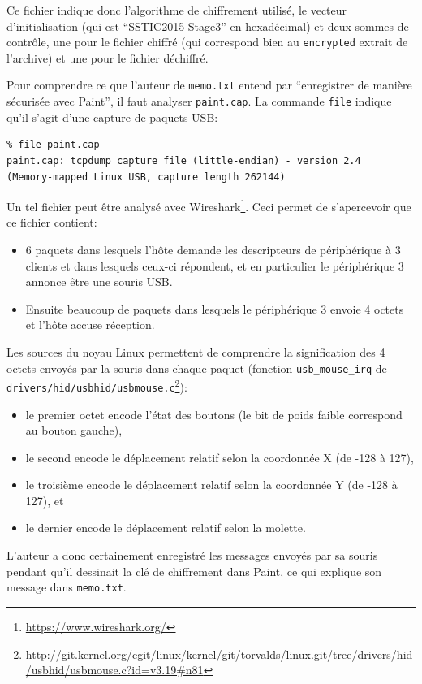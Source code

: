 \documentclass[a4paper,10pt]{article}
\begin{document}
Ce fichier indique donc l'algorithme de chiffrement utilisé, le vecteur d'initialisation (qui est ``SSTIC2015-Stage3'' en hexadécimal) et deux sommes de contrôle, une pour le fichier chiffré (qui correspond bien au \texttt{encrypted} extrait de l'archive) et une pour le fichier déchiffré.

Pour comprendre ce que l'auteur de \texttt{memo.txt} entend par ``enregistrer de manière sécurisée avec Paint'', il faut analyser \texttt{paint.cap}.
La commande \texttt{file} indique qu'il s'agit d'une capture de paquets USB:
\begin{verbatim}
% file paint.cap
paint.cap: tcpdump capture file (little-endian) - version 2.4
(Memory-mapped Linux USB, capture length 262144)
\end{verbatim}

Un tel fichier peut être analysé avec Wireshark\footnote{\url{https://www.wireshark.org/}}.
Ceci permet de s'apercevoir que ce fichier contient:
\begin{itemize}
  \item 6 paquets dans lesquels l'hôte demande les descripteurs de périphérique à 3 clients et dans lesquels ceux-ci répondent, et en particulier le périphérique 3 annonce être une souris USB.
  \item Ensuite beaucoup de paquets dans lesquels le périphérique 3 envoie 4 octets et l'hôte accuse réception.
\end{itemize}

Les sources du noyau Linux permettent de comprendre la signification des 4 octets envoyés par la souris dans chaque paquet (fonction \texttt{usb\_mouse\_irq} de \texttt{drivers/hid/usbhid/usbmouse.c}\footnote{\url{http://git.kernel.org/cgit/linux/kernel/git/torvalds/linux.git/tree/drivers/hid/usbhid/usbmouse.c?id=v3.19\#n81}}):
\begin{itemize}
  \item le premier octet encode l'état des boutons (le bit de poids faible correspond au bouton gauche),
  \item le second encode le déplacement relatif selon la coordonnée X (de -128 à 127),
  \item le troisième encode le déplacement relatif selon la coordonnée Y (de -128 à 127), et
  \item le dernier encode le déplacement relatif selon la molette.
\end{itemize}

L'auteur a donc certainement enregistré les messages envoyés par sa souris pendant qu'il dessinait la clé de chiffrement dans Paint, ce qui explique son message dans \texttt{memo.txt}.
\end{document}

